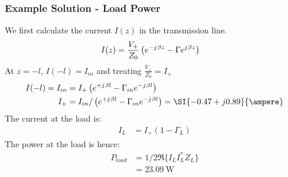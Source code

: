 \documentclass[10pt, compress]{beamer}
\renewcommand{\j}{{j}\mkern1mu} %
\begin{document}
\begin{frame}
  \frametitle{Example Solution - Load Power}
We first calculate the current $I(z)$ in the transmission line.
\begin{align*}
  I(z) &= \frac{V_{+}}{Z_0} \left( e^{-\j \beta z} - \Gamma e^{\j \beta z}\right) 
\end{align*}
At $z = -l$, $I(-l) = I_{in}$ and treating $\frac{V_{+}}{Z_0} = I_{+}$
\begin{align*}
  I(-l) = I_{in} &= I_{+} \left( e^{+\j \beta l} - \Gamma_{in} e^{-\j \beta l}\right) \\
  I_{+} &= I_{in}/\left( e^{+\j \beta l} - \Gamma_{in} e^{-\j \beta l}\right)  = \SI{-0.47 + j 0.89}{\ampere}
\end{align*}
The current at the load is:
\begin{align*}
  I_L &= I_{+}(1 - \Gamma_L)
\end{align*}
The power at the load is hence:
\begin{align*}
  P_{load} &= 1/2 \Re\{I_{L} I_{L }^*Z_L\} \\
    &= \SI{23.09}{\watt}
\end{align*}
\end{frame}


  

\end{document}
